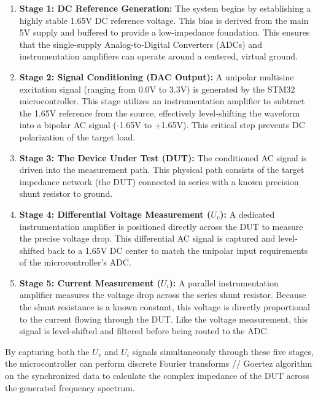 \begin{enumerate}
    \item \textbf{Stage 1: DC Reference Generation:} The system begins by establishing a highly stable 1.65V DC reference voltage. This bias is derived from the main 5V supply and buffered to provide a low-impedance foundation. This ensures that the single-supply Analog-to-Digital Converters (ADCs) and instrumentation amplifiers can operate around a centered, virtual ground.
    
    \item \textbf{Stage 2: Signal Conditioning (DAC Output):} A unipolar multisine excitation signal (ranging from 0.0V to 3.3V) is generated by the STM32 microcontroller. This stage utilizes an instrumentation amplifier to subtract the 1.65V reference from the source, effectively level-shifting the waveform into a bipolar AC signal (-1.65V to +1.65V). This critical step prevents DC polarization of the target load.
    
    \item \textbf{Stage 3: The Device Under Test (DUT):} The conditioned AC signal is driven into the measurement path. This physical path consists of the target impedance network (the DUT) connected in series with a known precision shunt resistor to ground. 
    
    \item \textbf{Stage 4: Differential Voltage Measurement ($U_v$):} A dedicated instrumentation amplifier is positioned directly across the DUT to measure the precise voltage drop. This differential AC signal is captured and level-shifted back to a 1.65V DC center to match the unipolar input requirements of the microcontroller's ADC.
    
    \item \textbf{Stage 5: Current Measurement ($U_i$):} A parallel instrumentation amplifier measures the voltage drop across the series shunt resistor. Because the shunt resistance is a known constant, this voltage is directly proportional to the current flowing through the DUT. Like the voltage measurement, this signal is level-shifted and filtered before being routed to the ADC.
\end{enumerate}

By capturing both the $U_v$ and $U_i$ signals simultaneously through these five stages, the microcontroller can perform discrete Fourier transforms // Goertez algorithm on the synchronized data to calculate the complex impedance of the DUT across the generated frequency spectrum.

